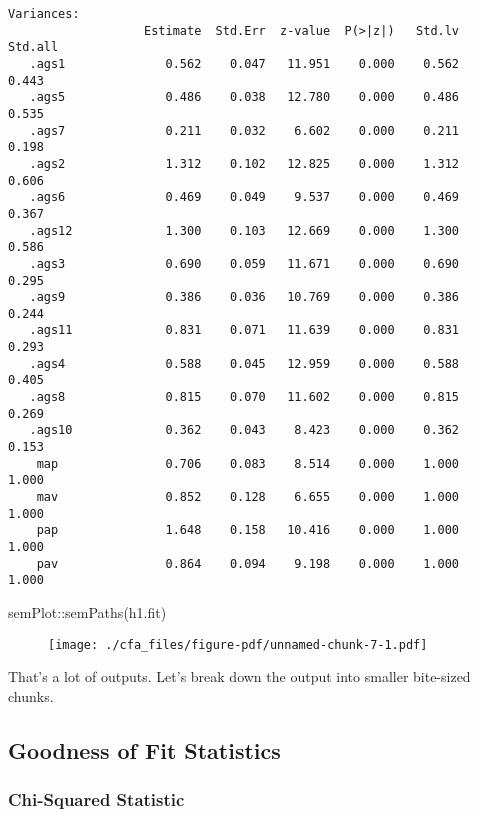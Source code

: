 \documentclass[
  letterpaper,
  DIV=11,
  numbers=noendperiod]{scrreprt}
\newenvironment{Shaded}{\begin{snugshade}}{\end{snugshade}}
\newcommand{\FunctionTok}[1]{\textcolor[rgb]{0.28,0.35,0.67}{#1}}
\newcommand{\NormalTok}[1]{\textcolor[rgb]{0.00,0.23,0.31}{#1}}
\newcommand{\SpecialCharTok}[1]{\textcolor[rgb]{0.37,0.37,0.37}{#1}}
\begin{document}
\begin{verbatim}
Variances:
                   Estimate  Std.Err  z-value  P(>|z|)   Std.lv  Std.all
   .ags1              0.562    0.047   11.951    0.000    0.562    0.443
   .ags5              0.486    0.038   12.780    0.000    0.486    0.535
   .ags7              0.211    0.032    6.602    0.000    0.211    0.198
   .ags2              1.312    0.102   12.825    0.000    1.312    0.606
   .ags6              0.469    0.049    9.537    0.000    0.469    0.367
   .ags12             1.300    0.103   12.669    0.000    1.300    0.586
   .ags3              0.690    0.059   11.671    0.000    0.690    0.295
   .ags9              0.386    0.036   10.769    0.000    0.386    0.244
   .ags11             0.831    0.071   11.639    0.000    0.831    0.293
   .ags4              0.588    0.045   12.959    0.000    0.588    0.405
   .ags8              0.815    0.070   11.602    0.000    0.815    0.269
   .ags10             0.362    0.043    8.423    0.000    0.362    0.153
    map               0.706    0.083    8.514    0.000    1.000    1.000
    mav               0.852    0.128    6.655    0.000    1.000    1.000
    pap               1.648    0.158   10.416    0.000    1.000    1.000
    pav               0.864    0.094    9.198    0.000    1.000    1.000
\end{verbatim}

\begin{Shaded}
\begin{Highlighting}[]
\NormalTok{semPlot}\SpecialCharTok{::}\FunctionTok{semPaths}\NormalTok{(h1.fit)}
\end{Highlighting}
\end{Shaded}

\begin{figure}[H]

{\centering \texttt{[image: ./cfa\_files/figure-pdf/unnamed-chunk-7-1.pdf]}

}

\end{figure}

That's a lot of outputs. Let's break down the output into smaller
bite-sized chunks.

\hypertarget{goodness-of-fit-statistics}{%
\subsection*{Goodness of Fit
Statistics}\label{goodness-of-fit-statistics}}

\hypertarget{chi-squared-statistic}{%
\subsubsection*{Chi-Squared Statistic}\label{chi-squared-statistic}}
\end{document}
